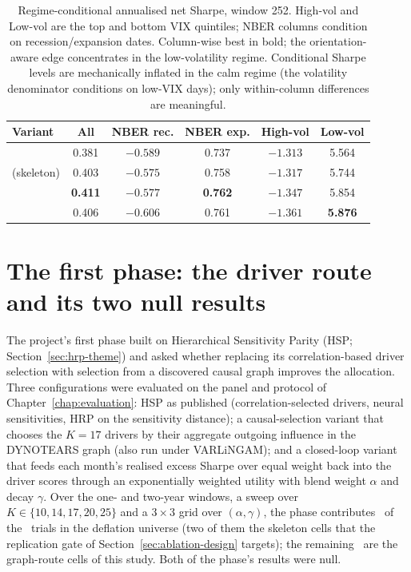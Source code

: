 \begin{table}[h]
  \centering
  \caption{Regime-conditional annualised net Sharpe, window 252. High-vol
    and Low-vol are the top and bottom VIX quintiles; NBER columns condition
    on recession/expansion dates. Column-wise best in bold; the
    orientation-aware edge concentrates in the low-volatility regime.
    Conditional Sharpe levels are mechanically inflated in the calm
    regime (the volatility denominator conditions on low-VIX days); only
    within-column differences are meaningful.}
  \label{tab:regime-full}
  \begin{tabular}{l c c c c c}
    \toprule
    Variant & All & NBER rec. & NBER exp. & High-vol & Low-vol \\
    \midrule
    \HRP{}     & 0.381 & $-0.589$ & 0.737 & $\mathbf{-1.313}$ & 5.564 \\
    \skelsamp{} (skeleton)     & 0.403 & $\mathbf{-0.575}$ & 0.758 & $-1.317$ & 5.744 \\
    \skelsem{}                & \textbf{0.411} & $-0.577$ & \textbf{0.762} & $-1.347$ & 5.854 \\
    \orientsem{}               & 0.406 & $-0.606$ & 0.761 & $-1.361$ & \textbf{5.876} \\
    \bottomrule
  \end{tabular}
\end{table}

\section{The first phase: the driver route and its two null results}
\label{app:hsp}

The project's first phase built on Hierarchical Sensitivity Parity (HSP;
Section~\ref{sec:hrp-theme}) and asked whether replacing its
correlation-based driver selection with selection from a discovered causal
graph improves the allocation. Three configurations were evaluated on the
panel and protocol of Chapter~\ref{chap:evaluation}: HSP as published
(correlation-selected drivers, neural sensitivities, HRP on the sensitivity
distance); a causal-selection variant that chooses the $K{=}17$ drivers by
their aggregate outgoing influence in the DYNOTEARS graph (also run under
VARLiNGAM); and a closed-loop variant that feeds each month's realised
excess Sharpe over equal weight back into the driver scores through an
exponentially weighted utility with blend weight $\alpha$ and decay
$\gamma$. Over the one- and two-year windows, a sweep over
$K\in\{10,14,17,20,25\}$ and a $3\times3$ grid over $(\alpha,\gamma)$,
the phase contributes \rsNtrialsPhaseI\ of the \rsNtrials\ trials in the
deflation universe (two of them the skeleton cells that the replication
gate of Section~\ref{sec:ablation-design} targets); the remaining
\rsNtrialsPhaseII\ are the graph-route cells of this study. Both of the
phase's results were null.

